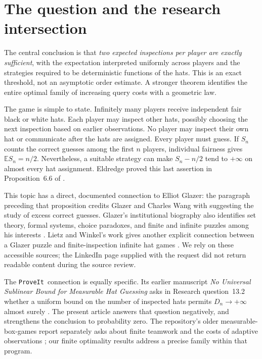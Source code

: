\documentclass[11pt,letterpaper]{article}
\theoremstyle{definition}
\newcommand{\E}{\mathbb E}
\newcommand{\repo}{\texttt{ProveIt}}
\begin{document}
\section{The question and the research intersection}
\label{mbg:insp:sec:intro}

The central conclusion is that \emph{two expected inspections per
player are exactly sufficient}, with the expectation interpreted
uniformly across players and the strategies required to be
deterministic functions of the hats. This is an exact threshold, not
an asymptotic order estimate. A stronger theorem identifies the entire
optimal family of increasing query costs with a geometric law.

The game is simple to state. Infinitely many players receive independent
fair black or white hats. Each player may inspect other hats, possibly
choosing the next inspection based on earlier observations. No player
may inspect their own hat or communicate after the hats are assigned.
Every player must guess. If \(S_n\) counts the correct guesses among the
first \(n\) players, individual fairness gives
\(\E S_n=n/2\). Nevertheless, a suitable strategy can make
\(S_n-n/2\) tend to \(+\infty\) on almost every hat assignment.
Eldredge proved this last assertion in Proposition~6.6 of
\cite{hat:Eldredge}.

This topic has a direct, documented connection to Elliot Glazer:
the paragraph preceding that proposition credits Glazer and Charles
Wang with suggesting the study of excess correct guesses.
Glazer's institutional biography also identifies set theory, formal
systems, choice paradoxes, and finite and infinite puzzles among his
interests \cite{insp:GlazerBio}. Lietz and Winkel's work gives another
explicit connection between a Glazer puzzle and finite-inspection
infinite hat games \cite{insp:LietzWinkel}. We rely on these accessible
sources; the LinkedIn page supplied with the request did not return
readable content during the source review.

The \repo\ connection is equally specific. Its earlier manuscript
\emph{No Universal Sublinear Bound for Measurable Hat Guessing}
asks in Research question~13.2 whether a uniform bound on the number
of inspected hats permits \(D_n\to+\infty\) almost surely
\cite{qry:PriorHat}. The present article answers that question negatively,
and strengthens the conclusion to probability zero. The repository's
older measurable-box-games report separately asks about finite teamwork
and the costs of adaptive observations \cite{qry:RepoBoxes}; our finite
optimality results address a precise family within that program.
\end{document}
